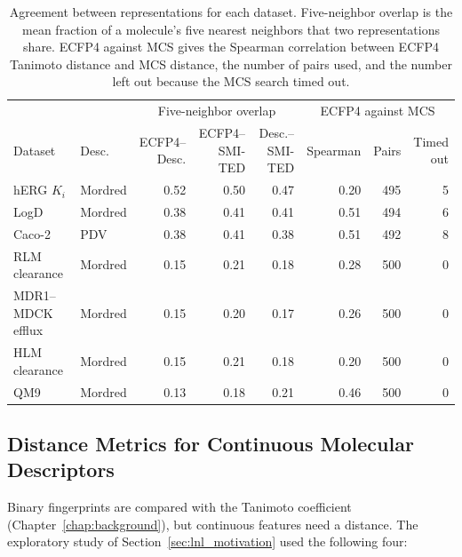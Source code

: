 \begin{table}[t]
\centering
\small
\setlength{\tabcolsep}{4pt}
\begin{adjustbox}{max width=\textwidth,max totalheight=0.78\textheight}
\begin{tabular}{llrrrrrr}
\toprule
 & & \multicolumn{3}{c}{Five-neighbor overlap} & \multicolumn{3}{c}{ECFP4 against MCS} \\
\cmidrule(lr){3-5}\cmidrule(lr){6-8}
Dataset & Desc. & \makecell{ECFP4--\\Desc.} & \makecell{ECFP4--\\SMI-TED} & \makecell{Desc.--\\SMI-TED} & Spearman & Pairs & \makecell{Timed\\out} \\
\midrule
hERG $K_i$ & Mordred & 0.52 & 0.50 & 0.47 & 0.20 & 495 & 5 \\
LogD & Mordred & 0.38 & 0.41 & 0.41 & 0.51 & 494 & 6 \\
Caco-2 & PDV & 0.38 & 0.41 & 0.38 & 0.51 & 492 & 8 \\
RLM clearance & Mordred & 0.15 & 0.21 & 0.18 & 0.28 & 500 & 0 \\
MDR1--MDCK efflux & Mordred & 0.15 & 0.20 & 0.17 & 0.26 & 500 & 0 \\
HLM clearance & Mordred & 0.15 & 0.21 & 0.18 & 0.20 & 500 & 0 \\
QM9 & Mordred & 0.13 & 0.18 & 0.21 & 0.46 & 500 & 0 \\
\bottomrule
\end{tabular}
\end{adjustbox}
\caption[Agreement between representations per dataset.]{Agreement between representations for each dataset. Five-neighbor overlap is the mean fraction of a molecule's five nearest neighbors that two representations share. ECFP4 against MCS gives the Spearman correlation between ECFP4 Tanimoto distance and MCS distance, the number of pairs used, and the number left out because the MCS search timed out.}
\label{tab:flaws:neighbor_overlap}
\end{table}


\subsection{Distance Metrics for Continuous Molecular Descriptors}

Binary fingerprints are compared with the Tanimoto coefficient (Chapter~\ref{chap:background}), but continuous features need a distance. The exploratory study of Section~\ref{sec:lnl_motivation} used the following four:

